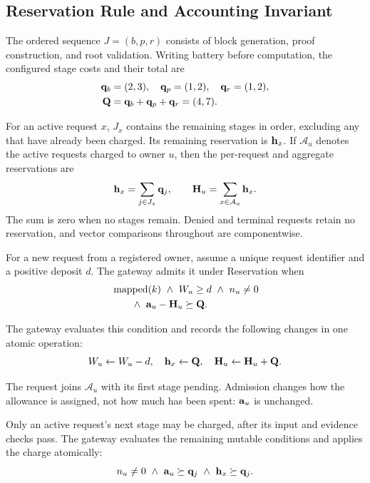 \subsection{Reservation Rule and Accounting Invariant}

The ordered sequence $J=(b,p,r)$ consists of block generation, proof
construction, and root validation. Writing battery before computation, the
configured stage costs and their total are
\begin{equation}
\begin{aligned}
\mathbf q_b&=(2,3),\quad \mathbf q_p=(1,2),\quad \mathbf q_r=(1,2),\\
\mathbf Q&=\mathbf q_b+\mathbf q_p+\mathbf q_r=(4,7).
\end{aligned}
\label{eq:cost}
\end{equation}

For an active request $x$, $J_x$ contains the remaining stages in order,
excluding any that have already been charged. Its remaining reservation is
$\mathbf h_x$. If $\mathcal A_u$ denotes the active requests charged to owner $u$,
then the per-request and aggregate reservations are
\[
\mathbf h_x=\sum_{j\in J_x}\mathbf q_j,\qquad
\mathbf H_u=\sum_{x\in\mathcal A_u}\mathbf h_x.
\]
The sum is zero when no stages remain. Denied and terminal requests retain
no reservation, and vector comparisons throughout are componentwise.

For a new request from a registered owner, assume a unique request identifier
and a positive deposit $d$. The gateway admits it under Reservation when
\begin{equation}
\begin{aligned}
&\operatorname{mapped}(k)\ \land\ W_u\ge d\ \land\ n_u\ne0\\
&\hspace{2em}\land\ \mathbf a_u-\mathbf H_u\succeq\mathbf Q.
\end{aligned}
\label{eq:admit}
\end{equation}

The gateway evaluates this condition and records the following changes in
one atomic operation:
\begin{equation}
W_u\leftarrow W_u-d,\quad \mathbf h_x\leftarrow\mathbf Q,\quad
\mathbf H_u\leftarrow\mathbf H_u+\mathbf Q.
\label{eq:hold}
\end{equation}

The request joins $\mathcal A_u$ with its first stage pending. Admission
changes how the allowance is assigned, not how much has been spent:
$\mathbf a_u$ is unchanged.

Only an active request's next stage may be charged, after its input and
evidence checks pass. The gateway evaluates the remaining mutable conditions
and applies the charge atomically:
\begin{equation}
n_u\ne0\ \land\ \va_u\succeq\vq_j\ \land\ \vh_x\succeq\vq_j.
\label{eq:stage-budget}
\end{equation}

